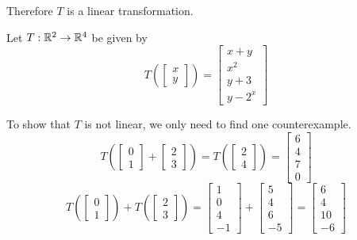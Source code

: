 \begin{applicationActivities}
\begin{example}
Therefore \(T\) is a linear transformation.
\end{example}

\begin{example}
Let \(T : \mathbb{R}^2 \rightarrow \mathbb{R}^4\) be given by
\[
  T\left(\begin{bmatrix} x \\ y \end{bmatrix} \right)
=
  \begin{bmatrix} x+y \\ x^2 \\ y+3 \\ y-2^x \end{bmatrix}
\]

To show that \(T\) is not linear, we only need to find one
counterexample.
\[
  T\left(
    \begin{bmatrix} 0 \\ 1 \end{bmatrix} +
    \begin{bmatrix} 2 \\ 3 \end{bmatrix}
  \right)
=
  T\left(
    \begin{bmatrix} 2 \\ 4 \end{bmatrix}
  \right) =
  \begin{bmatrix} 6 \\ 4 \\ 7 \\ 0 \end{bmatrix}
\]
\[
  T\left(
    \begin{bmatrix} 0 \\ 1 \end{bmatrix}
  \right) + T\left(
    \begin{bmatrix} 2 \\ 3\end{bmatrix}
  \right)
=
  \begin{bmatrix} 1 \\ 0 \\ 4 \\ -1 \end{bmatrix} +
  \begin{bmatrix} 5 \\ 4 \\ 6 \\ -5 \end{bmatrix}
=
  \begin{bmatrix} 6 \\ 4 \\ 10 \\ -6 \end{bmatrix}
\]


\end{example}
\end{applicationActivities}

